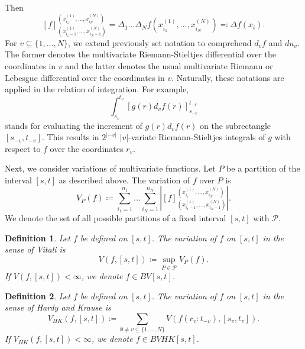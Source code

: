 \documentclass[english, a4paper, 12pt,reqno]{amsart}
\newtheorem{defi}{Definition}[section]
\begin{document}
Then
\begin{equation}
\label{difference}
[f]_{(x^{(1)}_{i_1-1}, \dots, x^{(N)}_{i_N-1})}^{(x^{(1)}_{i_1}, \dots, x^{(N)}_{i_N})} = \Delta_1\dots \Delta_N f(x^{(1)}_{i_1}, \dots, x^{(N)}_{i_N})\eqqcolon \Delta f(x_i).
\end{equation}
For $v \subseteq\{1,\dots,N\}$, we extend previously set notation to comprehend $d_vf$ and $du_v$. The former denotes the multivariate Riemann-Stieltjes differential over the coordinates in $v$ and the latter denotes the usual multivariate Riemann or Lebesgue differential over the coordinates in $v$. Naturally, these notations are applied in the relation of integration. For example,
\begin{equation*}
\int_{s_v}^{t_v} [g(r)d_v f(r)]_{s_{-v}}^{t_{-v}}
\end{equation*}
stands for evaluating the increment of $g(r) d_vf(r)$ on the subrectangle $[s_{-v}, t_{-v}]$. This results in $2^{|-v|}$ $|v|$-variate Riemann-Stieltjes integrals of $g$ with respect to $f$ over the coordinates $r_v$.

Next, we consider variations of multivariate functions. Let $P$ be a partition of the interval $[s,t]$ as described above. The variation of $f$ over $P$ is
$$ V_P(f) \coloneqq \sum_{i_1 = 1}^{n_1}\dots\sum_{i_N = 1}^{n_N}\left| [f]_{(x^{(1)}_{i_1-1}, \dots, x^{(N)}_{i_N-1})}^{(x^{(1)}_{i_1}, \dots, x^{(N)}_{i_N})} \right|.$$
We denote the set of all possible partitions of a fixed interval $[s,t]$ with $\mathcal{P}$.

\begin{defi}
\label{defi:vitali}
Let $f$ be defined on $[s,t]$. The variation of $f$ on $[s,t]$ in the sense of Vitali is
\begin{equation*}
V(f, [s,t]) \coloneqq  \sup_{P\in\mathcal{P}} V_P(f).
\end{equation*}
If $V(f, [s,t]) < \infty$, we denote $f\in BV[s,t]$.
\end{defi}

\begin{defi}
\label{defi:HKBV}
Let $f$ be defined on $[s,t]$. The variation of $f$ on $[s,t]$ in the sense of Hardy and Krause is
\begin{equation*}
V_{HK}(f, [s,t]) \coloneqq \sum_{\emptyset \neq v \subseteq \{1,\dots,N\}} V (f(r_v:t_{-v}), [s_v,t_v]).
\end{equation*}
If $V_{HK}(f, [s,t]) < \infty$, we denote $f\in BVHK[s,t]$.
\end{defi}
\end{document}
